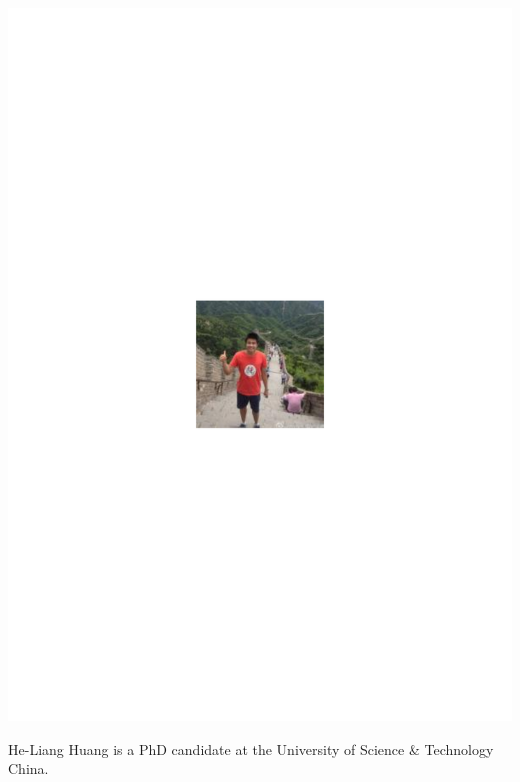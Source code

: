 \includegraphics[width=\columnwidth]{photo_heliang_huang}

He-Liang Huang is a PhD candidate at the University of Science \& Technology China.


